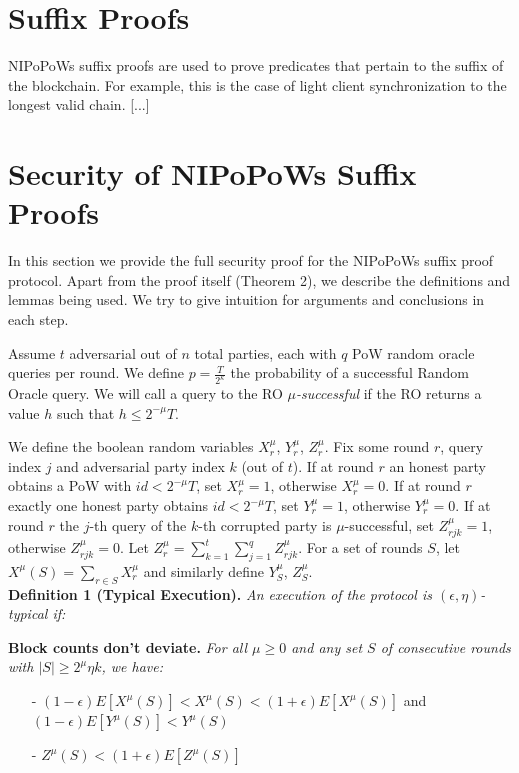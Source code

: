 \documentclass[11pt,a4paper]{article}
\begin{document}
\section{Suffix Proofs}
NIPoPoWs suffix proofs are used to prove predicates that pertain to the suffix of the blockchain. For example, this is the case of light client synchronization to the longest valid chain.
 [...]
 

\section{Security of NIPoPoWs Suffix Proofs} \label{proof_under_hard_fork}

In this section we provide the full security proof for the NIPoPoWs suffix proof protocol\cite{NIPoPoWs}. Apart from the proof itself (Theorem 2), we describe the definitions and lemmas being used. We try to give intuition for arguments and conclusions in each step.

Assume $t$ adversarial out of $n$ total parties, each with $q$ PoW random oracle queries per round. We define $p = \frac{T}{2^\kappa}$ the probability of a successful Random Oracle query. We will call a query to the RO $\mu$\textit{-successful} if the RO returns a value $h$ such that $h \leq 2^{-\mu}T$.

We define the boolean random variables $X_r^{\mu}$, $Y_r^{\mu}$, $Z_r^{\mu}$. Fix some round $r$, query index $j$ and adversarial party index $k$ (out of $t$). If at round $r$ an honest party obtains a PoW with $id < 2^{-\mu}T$, set $X_r^{\mu} = 1$, otherwise $X_r^{\mu} = 0$. If at round $r$ exactly one honest party obtains $id < 2^{-\mu}T$, set $Y_r^{\mu} = 1$, otherwise $Y_r^{\mu} = 0$. If at round $r$ the $j$-th query of the $k$-th corrupted party is $\mu$-successful, set $Z_{rjk}^{\mu} = 1$, otherwise $Z_{rjk}^{\mu} = 0$. Let $Z_r^{\mu} = \sum_{k=1}^t\sum_{j=1}^qZ_{rjk}^{\mu}$. For a set of rounds $S$, let $X^\mu(S) = \sum_{r \in S}X^{\mu}_r$ and similarly define $Y_S^{\mu}$, $Z_S^{\mu}$.\\

\textbf{Definition 1 (Typical Execution).} \textit{An execution of the protocol is $(\epsilon, \eta)$-typical if:}

\textbf{Block counts don't deviate.} \textit{For all $\mu \geq 0$ and any set $S$ of consecutive rounds with $\vert S \vert \geq 2^\mu \eta k$, we have:}
\begin{itemize}
\item[-] $(1-\epsilon)E[X^\mu(S)] < X^\mu(S) < (1+\epsilon)E[X^\mu(S)] $ and $(1-\epsilon)E[Y^\mu(S)] < Y^\mu(S)$
\item[-] $Z^\mu(S) < (1+\epsilon)E[Z^\mu(S)]$
\end{itemize}
\end{document}
